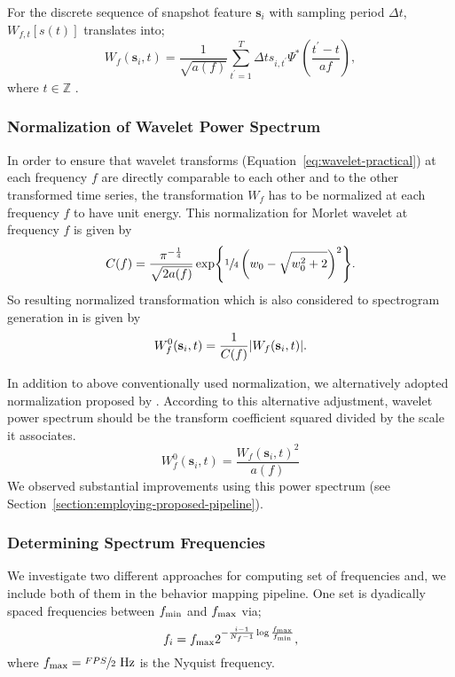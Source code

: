 For the discrete sequence of snapshot feature $\mathbf{s}_i$ with sampling period $\Delta t$, $W_{f,t}[s(t)]$ translates into;
\begin{equation}
	\label{eq:wavelet-practical}
	W_{f}(\mathbf{s}_i, t) = \frac{1}{\sqrt{a(f)}} \sum_{t^{\prime}=1}^{T} {\Delta t} s_{i,t^{\prime}} \mathit{\Psi}^{\ast}\left(\frac{t^{\prime}-t}{a{f}}\right),
\end{equation}
where $t \in \mathbb{Z}$ \citep{torrence_practical_1998}.

\subsubsection{Normalization of Wavelet Power Spectrum}
In order to ensure that wavelet transforms (Equation~\ref{eq:wavelet-practical}) at each frequency $f$ are directly comparable to each other and to the other transformed time series, the transformation $W_f$ has to be normalized at each frequency $f$ to have unit energy.
This normalization for Morlet wavelet at frequency $f$ is given by
\begin{equation}
	C(f) = \frac{\pi^{-\frac{1}{4}}}{\sqrt{2a(f)}}\exp{\sfrac{1}{4}\left(w_0-\sqrt{w_0^2+2}\right)^2}.
\end{equation}
So resulting normalized transformation which is also considered to spectrogram generation in \citet{berman_mapping_2014} is given by
\begin{equation}
	W^0_f(\mathbf{s}_i, t) = \frac{1}{C(f)} \abs{W_f(\mathbf{s}_i, t)}.
\end{equation}

In addition to above conventionally used normalization, we alternatively adopted normalization proposed by \citet{liu_rectification_2007}. According to this alternative adjustment, wavelet power spectrum should be the transform coefficient squared divided by the scale it associates.
\begin{equation}
	W^{0}_f(\mathbf{s}_i, t) = \frac{W_f(\mathbf{s}_i, t)^2}{a(f)}
\end{equation}
We observed substantial improvements using this power spectrum (see Section~\ref{section:employing-proposed-pipeline}).

\subsubsection{Determining Spectrum Frequencies}
We investigate two different approaches for computing set of frequencies and, we include both of them in the behavior mapping pipeline.
One set is dyadically spaced frequencies between $f_{\textnormal{min}}$ and $f_{\textnormal{max}}$ via;
\begin{equation}
	f_i = f_{\textnormal{max}} 2^{-\frac{i-1}{N_f-1}\log{\frac{f_{\textnormal{max}}}{f_{\textnormal{min}}}}},
\end{equation}
where $f_{\textnormal{max}} = \sfrac{FPS}{2} \textnormal{ Hz}$ is the Nyquist frequency.


